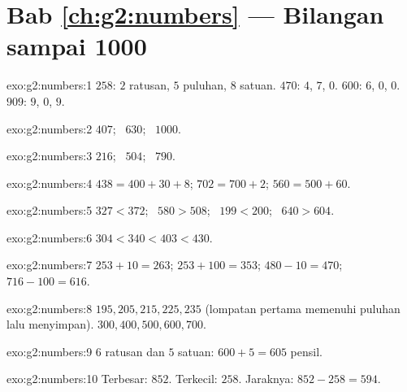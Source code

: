 \section*{Bab \ref{ch:g2:numbers} --- Bilangan sampai 1000}

\begin{solution}{exo:g2:numbers:1}
$258$: $2$ ratusan, $5$ puluhan, $8$ satuan. $470$: $4$, $7$, $0$.
$600$: $6$, $0$, $0$. $909$: $9$, $0$, $9$.
\end{solution}

\begin{solution}{exo:g2:numbers:2}
$407$; \ $630$; \ $1000$.
\end{solution}

\begin{solution}{exo:g2:numbers:3}
$216$; \ $504$; \ $790$.
\end{solution}

\begin{solution}{exo:g2:numbers:4}
$438 = 400 + 30 + 8$; \quad $702 = 700 + 2$; \quad
$560 = 500 + 60$.
\end{solution}

\begin{solution}{exo:g2:numbers:5}
$327 < 372$; \ $580 > 508$; \ $199 < 200$; \ $640 > 604$.
\end{solution}

\begin{solution}{exo:g2:numbers:6}
$304 < 340 < 403 < 430$.
\end{solution}

\begin{solution}{exo:g2:numbers:7}
$253 + 10 = 263$; \quad $253 + 100 = 353$; \quad
$480 - 10 = 470$; \quad $716 - 100 = 616$.
\end{solution}

\begin{solution}{exo:g2:numbers:8}
$195, 205, 215, 225, 235$ (lompatan pertama memenuhi puluhan lalu
menyimpan). $300, 400, 500, 600, 700$.
\end{solution}

\begin{solution}{exo:g2:numbers:9}
$6$ ratusan dan $5$ satuan: $600 + 5 = 605$ pensil.
\end{solution}

\begin{solution}{exo:g2:numbers:10}
Terbesar: $852$. Terkecil: $258$. Jaraknya:
$852 - 258 = 594$.

\end{solution}
